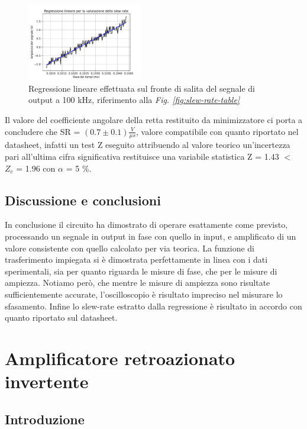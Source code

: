 \documentclass[journal]{IEEEtran}
\begin{document}
\begin{figure}[H]%
\begin {center}
\includegraphics[width=0.45\textwidth]{analysis/output/OPA-slew-rate-fit.pdf}
\caption{Regressione lineare effettuata sul fronte di salita del segnale di output a 100 kHz, riferimento alla \textit{Fig. \ref{fig:slew-rate-table}}}
\label{fig:slew-rate-fit}
\end {center}
\end{figure}
Il valore del coefficiente angolare della retta restituito da minimizzatore ci porta a concludere che SR = $(0.7 \pm 0.1) \frac{V}{\mu s}$, valore compatibile con quanto riportato nel datasheet, infatti un test Z eseguito attribuendo al valore teorico un'incertezza pari all'ultima cifra significativa restituisce una variabile statistica Z = 1.43 $<$ $Z_{c}$ = 1.96 con $\alpha$ = 5 \%.

\subsection{\textbf{Discussione e conclusioni}}
In conclusione il circuito ha dimostrato di operare esattamente come previsto, processando un segnale in output in fase con quello in input, e amplificato di un valore consistente con quello calcolato per via teorica. La funzione di trasferimento impiegata si è dimostrata perfettamente in linea con i dati sperimentali, sia per quanto riguarda le misure di fase, che per le misure di ampiezza. Notiamo però, che mentre le misure di ampiezza sono risultate sufficientemente accurate, l'oscilloscopio è risultato impreciso nel misurare lo sfasamento. Infine lo slew-rate estratto dalla regressione è risultato in accordo con quanto riportato sul datasheet.

\section{\textbf{Amplificatore retroazionato invertente}} %

\subsection{\textbf{Introduzione}}
\end{document}
